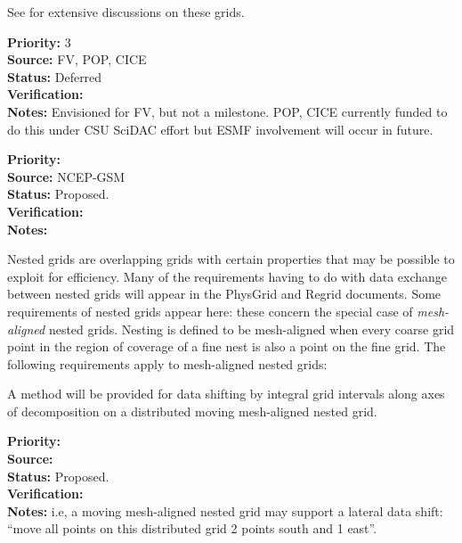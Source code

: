 

See \cite{art:heikes+:geodesic,art:majewski+:gme} for extensive
discussions on these grids.

\begin{reqlist}
{\bf Priority:} 3 \\ 
{\bf Source:} FV, POP, CICE \\
{\bf Status:} Deferred \\
{\bf Verification:} \\
{\bf Notes:} Envisioned for FV, but not a milestone.  POP, CICE
             currently funded to do this under CSU SciDAC effort
             but ESMF involvement will occur in future.
\end{reqlist}


\begin{reqlist}
{\bf Priority:} \\
{\bf Source:} NCEP-GSM \\
{\bf Status:} Proposed. \\
{\bf Verification:} \\
{\bf Notes:}
\end{reqlist}


Nested grids are overlapping grids with certain properties that may be
possible to exploit for efficiency. Many of the requirements having to
do with data exchange between nested grids will appear in the PhysGrid
and Regrid documents. Some requirements of nested grids appear here:
these concern the special case of \emph{mesh-aligned} nested
grids. Nesting is defined to be mesh-aligned when every coarse grid
point in the region of coverage of a fine nest is also a point on the
fine grid. The following requirements apply to mesh-aligned nested
grids:


A method will be provided for data shifting by integral grid intervals
along axes of decomposition on a distributed moving mesh-aligned
nested grid.

\begin{reqlist}
{\bf Priority:} \\
{\bf Source:} \\
{\bf Status:} Proposed. \\
{\bf Verification:} \\
{\bf Notes:} i.e, a moving mesh-aligned nested grid may support a
  lateral data shift: ``move all points on this distributed grid 2
  points south and 1 east''.
\end{reqlist}


